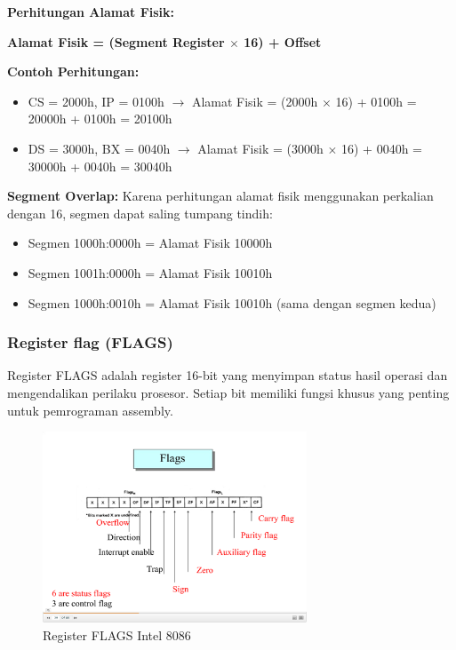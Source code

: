 \documentclass[../main.tex]{subfiles}
\begin{document}
\textbf{Perhitungan Alamat Fisik:}
\begin{center}
    \textbf{Alamat Fisik = (Segment Register $\times$ 16) + Offset}
\end{center}

\textbf{Contoh Perhitungan:}
\begin{itemize}
    \item CS = 2000h, IP = 0100h $\rightarrow$ Alamat Fisik = (2000h $\times$ 16) + 0100h = 20000h + 0100h = 20100h
    \item DS = 3000h, BX = 0040h $\rightarrow$ Alamat Fisik = (3000h $\times$ 16) + 0040h = 30000h + 0040h = 30040h
\end{itemize}

\textbf{Segment Overlap:}
Karena perhitungan alamat fisik menggunakan perkalian dengan 16, segmen dapat saling tumpang tindih:
\begin{itemize}
    \item Segmen 1000h:0000h = Alamat Fisik 10000h
    \item Segmen 1001h:0000h = Alamat Fisik 10010h
    \item Segmen 1000h:0010h = Alamat Fisik 10010h (sama dengan segmen kedua)
\end{itemize}

            \subsubsection{Register flag (FLAGS)}
Register FLAGS adalah register 16-bit yang menyimpan status hasil operasi dan mengendalikan perilaku prosesor. Setiap bit memiliki fungsi khusus yang penting untuk pemrograman assembly.

\begin{figure}[H]
    \centering
    \includegraphics[width=0.7\textwidth]{../images/8086_flags_register.png}
    \caption{Register FLAGS Intel 8086}
    \label{fig:8086-flags-register}
\end{figure}
\end{document}
